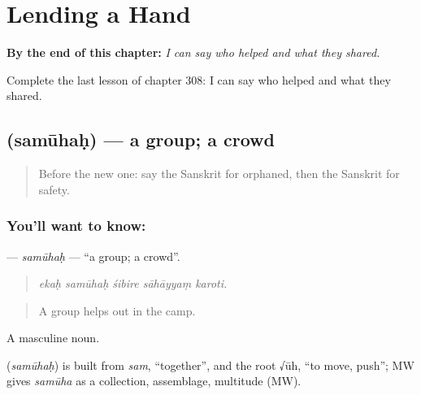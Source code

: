 
\chapter{Lending a Hand}
\label{ch:sa-lending-a-hand}

\begin{chapteropening}
\textbf{By the end of this chapter:} \emph{I can say who helped and what they shared.}

Complete the last lesson of chapter 308: I can say who helped and what they shared.
\end{chapteropening}

\section[\texorpdfstring{\sk{समूहः} (samūhaḥ)}{समूहः (samūhaḥ)}]{ (samūhaḥ) — a group; a crowd}

\label{lesson:SA-C308-samuhah}



\begin{quote}
Before the new one: say the Sanskrit for orphaned, then the Sanskrit for safety.
\end{quote}

\subsection*{You'll want to know: }
\textbf{} — \emph{samūhaḥ} — \textquotedblleft{}a group; a crowd\textquotedblright{}.

\begin{quote}
    
\end{quote}

\begin{quote}
\emph{ekaḥ samūhaḥ śibire sāhāyyaṃ karoti.}
\end{quote}

\begin{quote}
A group helps out in the camp.
\end{quote}

A masculine noun.

\begin{cousinweb}
\textbf{} (\emph{samūhaḥ}) is built from \emph{sam}, \textquotedblleft{}together\textquotedblright{}, and the root √ūh, \textquotedblleft{}to move, push\textquotedblright{}; MW gives \emph{samūha} as a collection, assemblage, multitude (MW).
\end{cousinweb}

